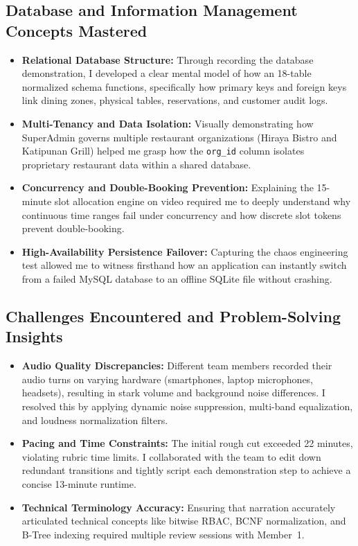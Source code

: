 \subsection{Database and Information Management Concepts Mastered}
\begin{itemize}
    \item \textbf{Relational Database Structure:} Through recording the database demonstration, I developed a clear mental model of how an 18-table normalized schema functions, specifically how primary keys and foreign keys link dining zones, physical tables, reservations, and customer audit logs.
    \item \textbf{Multi-Tenancy and Data Isolation:} Visually demonstrating how SuperAdmin governs multiple restaurant organizations (Hiraya Bistro and Katipunan Grill) helped me grasp how the \texttt{org\_id} column isolates proprietary restaurant data within a shared database.
    \item \textbf{Concurrency and Double-Booking Prevention:} Explaining the 15-minute slot allocation engine on video required me to deeply understand why continuous time ranges fail under concurrency and how discrete slot tokens prevent double-booking.
    \item \textbf{High-Availability Persistence Failover:} Capturing the chaos engineering test allowed me to witness firsthand how an application can instantly switch from a failed MySQL database to an offline SQLite file without crashing.
\end{itemize}

\subsection{Challenges Encountered and Problem-Solving Insights}
\begin{itemize}
    \item \textbf{Audio Quality Discrepancies:} Different team members recorded their audio turns on varying hardware (smartphones, laptop microphones, headsets), resulting in stark volume and background noise differences. I resolved this by applying dynamic noise suppression, multi-band equalization, and loudness normalization filters.
    \item \textbf{Pacing and Time Constraints:} The initial rough cut exceeded 22 minutes, violating rubric time limits. I collaborated with the team to edit down redundant transitions and tightly script each demonstration step to achieve a concise 13-minute runtime.
    \item \textbf{Technical Terminology Accuracy:} Ensuring that narration accurately articulated technical concepts like bitwise RBAC, BCNF normalization, and B-Tree indexing required multiple review sessions with Member~1.
\end{itemize}

